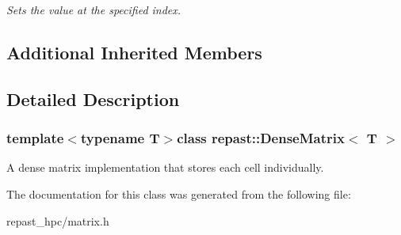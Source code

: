 \begin{DoxyCompactItemize}
\begin{DoxyCompactList}\small\item\em Sets the value at the specified index. \end{DoxyCompactList}\end{DoxyCompactItemize}
\subsection*{Additional Inherited Members}


\subsection{Detailed Description}
\subsubsection*{template$<$typename T$>$class repast\-::\-Dense\-Matrix$<$ T $>$}

A dense matrix implementation that stores each cell individually. 

The documentation for this class was generated from the following file\-:\begin{DoxyCompactItemize}
\item 
repast\-\_\-hpc/matrix.\-h\end{DoxyCompactItemize}
